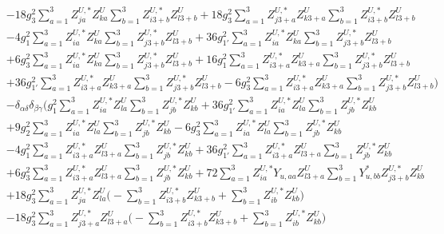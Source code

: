 \begin{align}
 &-18 g_{3}^{2} \sum_{a=1}^{3}Z^{U,*}_{j a} Z_{{k a}}^{U}  \sum_{b=1}^{3}Z^{U,*}_{i 3 + b} Z_{{l 3 + b}}^{U}  +18 g_{3}^{2} \sum_{a=1}^{3}Z^{U,*}_{j 3 + a} Z_{{k 3 + a}}^{U}  \sum_{b=1}^{3}Z^{U,*}_{i 3 + b} Z_{{l 3 + b}}^{U}  \nonumber \\ 
 &-4 g_{1}^{2} \sum_{a=1}^{3}Z^{U,*}_{i a} Z_{{k a}}^{U}  \sum_{b=1}^{3}Z^{U,*}_{j 3 + b} Z_{{l 3 + b}}^{U}  +36 g_{1'}^{2} \sum_{a=1}^{3}Z^{U,*}_{i a} Z_{{k a}}^{U}  \sum_{b=1}^{3}Z^{U,*}_{j 3 + b} Z_{{l 3 + b}}^{U}  \nonumber \\ 
 &+6 g_{3}^{2} \sum_{a=1}^{3}Z^{U,*}_{i a} Z_{{k a}}^{U}  \sum_{b=1}^{3}Z^{U,*}_{j 3 + b} Z_{{l 3 + b}}^{U}  +16 g_{1}^{2} \sum_{a=1}^{3}Z^{U,*}_{i 3 + a} Z_{{k 3 + a}}^{U}  \sum_{b=1}^{3}Z^{U,*}_{j 3 + b} Z_{{l 3 + b}}^{U}  \nonumber \\ 
 &+36 g_{1'}^{2} \sum_{a=1}^{3}Z^{U,*}_{i 3 + a} Z_{{k 3 + a}}^{U}  \sum_{b=1}^{3}Z^{U,*}_{j 3 + b} Z_{{l 3 + b}}^{U}  -6 g_{3}^{2} \sum_{a=1}^{3}Z^{U,*}_{i 3 + a} Z_{{k 3 + a}}^{U}  \sum_{b=1}^{3}Z^{U,*}_{j 3 + b} Z_{{l 3 + b}}^{U}  \Big)\nonumber \\ 
 &- \delta_{\alpha \delta} \delta_{\beta \gamma} \Big(g_{1}^{2} \sum_{a=1}^{3}Z^{U,*}_{i a} Z_{{l a}}^{U}  \sum_{b=1}^{3}Z^{U,*}_{j b} Z_{{k b}}^{U}  +36 g_{1'}^{2} \sum_{a=1}^{3}Z^{U,*}_{i a} Z_{{l a}}^{U}  \sum_{b=1}^{3}Z^{U,*}_{j b} Z_{{k b}}^{U}  \nonumber \\ 
 &+9 g_{2}^{2} \sum_{a=1}^{3}Z^{U,*}_{i a} Z_{{l a}}^{U}  \sum_{b=1}^{3}Z^{U,*}_{j b} Z_{{k b}}^{U}  -6 g_{3}^{2} \sum_{a=1}^{3}Z^{U,*}_{i a} Z_{{l a}}^{U}  \sum_{b=1}^{3}Z^{U,*}_{j b} Z_{{k b}}^{U}  \nonumber \\ 
 &-4 g_{1}^{2} \sum_{a=1}^{3}Z^{U,*}_{i 3 + a} Z_{{l 3 + a}}^{U}  \sum_{b=1}^{3}Z^{U,*}_{j b} Z_{{k b}}^{U}  +36 g_{1'}^{2} \sum_{a=1}^{3}Z^{U,*}_{i 3 + a} Z_{{l 3 + a}}^{U}  \sum_{b=1}^{3}Z^{U,*}_{j b} Z_{{k b}}^{U}  \nonumber \\ 
 &+6 g_{3}^{2} \sum_{a=1}^{3}Z^{U,*}_{i 3 + a} Z_{{l 3 + a}}^{U}  \sum_{b=1}^{3}Z^{U,*}_{j b} Z_{{k b}}^{U}  +72 \sum_{a=1}^{3}Z^{U,*}_{i a} Y_{u,{a a}} Z_{{l 3 + a}}^{U}  \sum_{b=1}^{3}Y^*_{u,{b b}} Z^{U,*}_{j 3 + b} Z_{{k b}}^{U}  \nonumber \\ 
 &+18 g_{3}^{2} \sum_{a=1}^{3}Z^{U,*}_{j a} Z_{{l a}}^{U}  \Big(- \sum_{b=1}^{3}Z^{U,*}_{i 3 + b} Z_{{k 3 + b}}^{U}   + \sum_{b=1}^{3}Z^{U,*}_{i b} Z_{{k b}}^{U} \Big)\nonumber \\ 
 &-18 g_{3}^{2} \sum_{a=1}^{3}Z^{U,*}_{j 3 + a} Z_{{l 3 + a}}^{U}  \Big(- \sum_{b=1}^{3}Z^{U,*}_{i 3 + b} Z_{{k 3 + b}}^{U}   + \sum_{b=1}^{3}Z^{U,*}_{i b} Z_{{k b}}^{U} \Big)\nonumber \\ 

\end{align}
